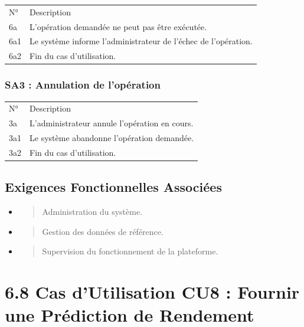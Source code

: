 \documentclass[
]{book}
\begin{document}
\begin{longtable}[]{@{}ll@{}}
\toprule
\endhead
N° & Description \\
6a & L'opération demandée ne peut pas être exécutée. \\
6a1 & Le système informe l'administrateur de l'échec de l'opération. \\
6a2 & Fin du cas d'utilisation. \\
\bottomrule
\end{longtable}

\hypertarget{sa3-annulation-de-lopuxe9ration-3}{%
\subsubsection{SA3 : Annulation de
l'opération}\label{sa3-annulation-de-lopuxe9ration-3}}

\begin{longtable}[]{@{}ll@{}}
\toprule
\endhead
N° & Description \\
3a & L'administrateur annule l'opération en cours. \\
3a1 & Le système abandonne l'opération demandée. \\
3a2 & Fin du cas d'utilisation. \\
\bottomrule
\end{longtable}

\hypertarget{exigences-fonctionnelles-associuxe9es-6}{%
\subsection{Exigences Fonctionnelles
Associées}\label{exigences-fonctionnelles-associuxe9es-6}}

\begin{itemize}
\item
  \begin{quote}
  Administration du système.
  \end{quote}
\item
  \begin{quote}
  Gestion des données de référence.
  \end{quote}
\item
  \begin{quote}
  Supervision du fonctionnement de la plateforme.
  \end{quote}
\end{itemize}

\hypertarget{cas-dutilisation-cu8-fournir-une-pruxe9diction-de-rendement}{%
\section{6.8 Cas d'Utilisation CU8 : Fournir une Prédiction de
Rendement}\label{cas-dutilisation-cu8-fournir-une-pruxe9diction-de-rendement}}
\end{document}
